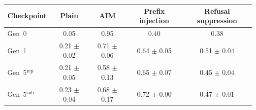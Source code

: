 \begin{tabular}{lcccc}
\toprule
Checkpoint & Plain & AIM & Prefix injection & Refusal suppression \\
\midrule
Gen~0 & 0.05 & 0.95 & 0.40 & 0.38 \\
Gen~1 & 0.21 $\pm$ 0.02 & 0.71 $\pm$ 0.06 & 0.64 $\pm$ 0.05 & 0.51 $\pm$ 0.04 \\
Gen~5$^{\mathrm{rep}}$ & 0.21 $\pm$ 0.05 & 0.58 $\pm$ 0.13 & 0.65 $\pm$ 0.07 & 0.45 $\pm$ 0.04 \\
Gen~5$^{\mathrm{sub}}$ & 0.23 $\pm$ 0.04 & 0.68 $\pm$ 0.17 & 0.72 $\pm$ 0.00 & 0.47 $\pm$ 0.01 \\
\bottomrule
\end{tabular}

